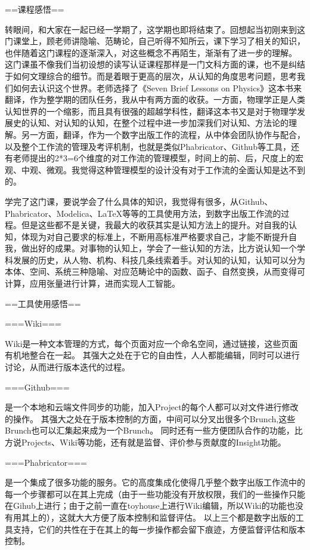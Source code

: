 \documentclass[11pt,fleqn]{book}
\numberwithin{dummy}{section}
\theoremstyle{ocrenumbox}
\theoremstyle{blacknumex}
\theoremstyle{blacknumbox}
\theoremstyle{ocrenum}
\newenvironment{remark}[1]{\par\vspace{10pt}\small %
	\begin{list}{}{
			\leftmargin=35pt %
			\rightmargin=25pt}\item\ignorespaces %
		\makebox[-2.5pt]{\begin{tikzpicture}[overlay]
			\node[draw=ocre!60,line width=1pt,circle,fill=ocre!25,font=\sffamily\bfseries,inner sep=2pt,outer sep=0pt] at (-15pt,0pt){\textcolor{ocre}{#1}};\end{tikzpicture}} %
		\advance\baselineskip -1pt}{\end{list}\vskip5pt} %
\newlength\esp
\begin{document}
\begin{remark}{黄}

==课程感悟==

转眼间，和大家在一起已经一学期了，这学期也即将结束了。回想起当初刚来到这门课堂上，顾老师讲隐喻、范畴论，自己听得不知所云，课下学习了相关的知识，也伴随着这门课程的逐渐深入，对这些概念不再陌生，渐渐有了进一步的理解。
这门课虽不像我们当初设想的读写认证课程那样是一门文科方面的课，也不是纠结于如何文理综合的细节。而是着眼于更高的层次，从认知的角度思考问题，思考我们如何去认识这个世界。老师选择了《Seven Brief Lessons on Physics》这本书来翻译，作为整学期的团队任务，我从中有两方面的收获。一方面，物理学正是人类认知世界的一个缩影，而且具有很强的超越学科性，翻译这本书又是对于物理学发展史的认知、对认知的认知，在整个过程中进一步加深我们对认知、方法论的理解。另一方面，翻译，作为一个数字出版工作的流程，从中体会团队协作与配合，以及整个工作流的管理及考评机制，也就是类似Phabricator、Github等工具，还有老师提出的2*3=6个维度的对工作流的管理模型，时间上的前、后，尺度上的宏观、中观、微观。我觉得这种管理模型的设计没有对于工作流的全面认知是达不到的。

学完了这门课，要说学会了什么具体的知识，我觉得有很多，从Github、Phabricator、Modelica、LaTeX等等的工具使用方法，到数字出版工作流的过程。但是这些都不是关键，我最大的收获其实是认知方法上的提升。对自我的认知，体现为对自己要求的标准上，不断用高标准严格要求自己，才能不断提升自我，做出好的成果。对事物的认知上，学会了一些认知的方法，比方说认知一个学科发展的历史，从人物、机构、科技几条线索着手。对认知的认知，认知可以分为本体、空间、系统三种隐喻、对应范畴论中的函数、函子、自然变换，从而变得可计算，应用张量进行计算，进而实现人工智能。

==工具使用感悟==

===Wiki===

Wiki是一种文本管理的方式，每个页面对应一个命名空间，通过链接，这些页面有机地整合在一起。
其强大之处在于它的自由性，人人都能编辑，同时可以进行讨论，从而进行版本迭代的过程。

===Github===

是一个本地和云端文件同步的功能，加入Project的每个人都可以对文件进行修改的操作。
其强大之处在于版本控制的方面，中间可以分叉出很多个Brunch,这些Brunch也可以汇集起来成为一个Brunch。
同时还有一些方便团队合作的功能，比方说Projects、Wiki等功能，还有就是监督、评价参与贡献度的Insight功能。

===Phabricator===

是一个集成了很多功能的服务。它的高度集成化使得几乎整个数字出版工作流中的每一个步骤都可以在其上完成（由于一些功能没有开放权限，我们的一些操作只能在Gihub上进行；由于之前一直在toyhouse上进行Wiki编辑，所以Wiki的功能也没有用其上的），这就大大方便了版本控制和监督评估。
以上三个都是数字出版的工具支持，它们的共性在于在其上的每一步操作都会留下痕迹，方便监督评估和版本控制。


\end{remark}
\end{document}
